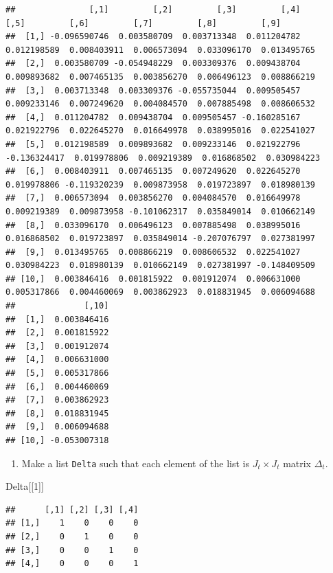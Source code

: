 \documentclass[
]{book}
\newenvironment{Shaded}{\begin{snugshade}}{\end{snugshade}}
\newcommand{\DecValTok}[1]{\textcolor[rgb]{0.00,0.00,0.81}{#1}}
\newcommand{\NormalTok}[1]{#1}
\providecommand{\tightlist}{%
  \setlength{\itemsep}{0pt}\setlength{\parskip}{0pt}}
\begin{document}
\begin{verbatim}
##               [,1]         [,2]         [,3]         [,4]         [,5]         [,6]         [,7]         [,8]         [,9]
##  [1,] -0.096590746  0.003580709  0.003713348  0.011204782  0.012198589  0.008403911  0.006573094  0.033096170  0.013495765
##  [2,]  0.003580709 -0.054948229  0.003309376  0.009438704  0.009893682  0.007465135  0.003856270  0.006496123  0.008866219
##  [3,]  0.003713348  0.003309376 -0.055735044  0.009505457  0.009233146  0.007249620  0.004084570  0.007885498  0.008606532
##  [4,]  0.011204782  0.009438704  0.009505457 -0.160285167  0.021922796  0.022645270  0.016649978  0.038995016  0.022541027
##  [5,]  0.012198589  0.009893682  0.009233146  0.021922796 -0.136324417  0.019978806  0.009219389  0.016868502  0.030984223
##  [6,]  0.008403911  0.007465135  0.007249620  0.022645270  0.019978806 -0.119320239  0.009873958  0.019723897  0.018980139
##  [7,]  0.006573094  0.003856270  0.004084570  0.016649978  0.009219389  0.009873958 -0.101062317  0.035849014  0.010662149
##  [8,]  0.033096170  0.006496123  0.007885498  0.038995016  0.016868502  0.019723897  0.035849014 -0.207076797  0.027381997
##  [9,]  0.013495765  0.008866219  0.008606532  0.022541027  0.030984223  0.018980139  0.010662149  0.027381997 -0.148409509
## [10,]  0.003846416  0.001815922  0.001912074  0.006631000  0.005317866  0.004460069  0.003862923  0.018831945  0.006094688
##              [,10]
##  [1,]  0.003846416
##  [2,]  0.001815922
##  [3,]  0.001912074
##  [4,]  0.006631000
##  [5,]  0.005317866
##  [6,]  0.004460069
##  [7,]  0.003862923
##  [8,]  0.018831945
##  [9,]  0.006094688
## [10,] -0.053007318
\end{verbatim}

\begin{enumerate}
\def\labelenumi{\arabic{enumi}.}
\setcounter{enumi}{5}
\tightlist
\item
  Make a list \texttt{Delta} such that each element of the list is \(J_t \times J_t\) matrix \(\Delta_t\).
\end{enumerate}

\begin{Shaded}
\begin{Highlighting}[]
\NormalTok{Delta[[}\DecValTok{1}\NormalTok{]]}
\end{Highlighting}
\end{Shaded}

\begin{verbatim}
##      [,1] [,2] [,3] [,4]
## [1,]    1    0    0    0
## [2,]    0    1    0    0
## [3,]    0    0    1    0
## [4,]    0    0    0    1
\end{verbatim}
\end{document}

